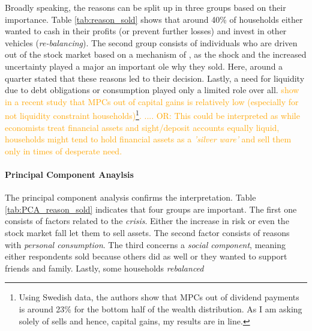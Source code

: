 \documentclass[ProjectABM]{subfiles}
\begin{document}
Broadly speaking, the reasons can be split up in three groups based on their importance. Table \ref{tab:reason_sold} shows that around 40\% of households either wanted to cash in their profits (or prevent further losses) and invest in other vehicles (\textit{re-balancing}). The second group consists of individuals who are driven out of the stock market based on a mechanism of \cite{malmendier_2011}, as the shock and the increased uncertainty played a major an important ole why they sold. Here, around a quarter stated that these reasons led to their decision. Lastly, a need for liquidity due to debt obligations or consumption played only a limited role over all. \textcolor{orange}{\cite{dimaggio_et_al_2020stock_mpc} show in a recent study that MPCs out of capital gains is relatively low (especially for not liquidity constraint households)\footnote{Using Swedish data, the authors show that MPCs out of dividend payments is around 23\% for the bottom half of the wealth distribution. As I am asking solely of sells and hence, capital gains, my results are in line.}. .... OR: This could be interpreted as while economists treat financial assets and sight/deposit accounts equally liquid, households might tend to hold financial assets as a \textit{'silver ware'} and sell them only in times of desperate need.}

\paragraph{Principal Component Anaylsis}
The principal component analysis confirms the interpretation. Table \ref{tab:PCA_reason_sold} indicates that four groups are important. The first one consists of factors related to the \textit{crisis}. Either the increase in risk or even the stock market fall let them to sell assets. The second factor consists of reasons with \textit{personal consumption}. The third concerns a \textit{social component}, meaning either respondents sold because others did as well or they wanted to support friends and family. Lastly, some households \textit{rebalanced}
\end{document}
